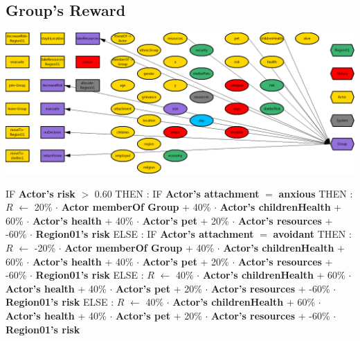 \documentclass{article}%
\begin{document}
%
\subsection{Group's Reward}%
\label{subsec:Group's Reward}%
\includegraphics[width=\textwidth]{images/Group.png}%
\begin{flushleft}%
IF %
\textbf{Actor's risk}%
$>$%
0.60%
\linebreak%
\hspace*{2em}%
THEN %
: %
IF %
\textbf{Actor's attachment}%
$=$%
\textbf{anxious}%
\linebreak%
\hspace*{4em}%
THEN %
: %
$R$%
$\leftarrow$%
20\%%
$\cdot$%
\textbf{Actor memberOf Group}%
+%
40\%%
$\cdot$%
\textbf{Actor's childrenHealth}%
+%
60\%%
$\cdot$%
\textbf{Actor's health}%
+%
40\%%
$\cdot$%
\textbf{Actor's pet}%
+%
20\%%
$\cdot$%
\textbf{Actor's resources}%
+%
{-}60\%%
$\cdot$%
\textbf{Region01's risk}%
\linebreak%
\hspace*{4em}%
ELSE %
: %
IF %
\textbf{Actor's attachment}%
$=$%
\textbf{avoidant}%
\linebreak%
\hspace*{6em}%
THEN %
: %
$R$%
$\leftarrow$%
{-}20\%%
$\cdot$%
\textbf{Actor memberOf Group}%
+%
40\%%
$\cdot$%
\textbf{Actor's childrenHealth}%
+%
60\%%
$\cdot$%
\textbf{Actor's health}%
+%
40\%%
$\cdot$%
\textbf{Actor's pet}%
+%
20\%%
$\cdot$%
\textbf{Actor's resources}%
+%
{-}60\%%
$\cdot$%
\textbf{Region01's risk}%
\linebreak%
\hspace*{6em}%
ELSE %
: %
$R$%
$\leftarrow$%
40\%%
$\cdot$%
\textbf{Actor's childrenHealth}%
+%
60\%%
$\cdot$%
\textbf{Actor's health}%
+%
40\%%
$\cdot$%
\textbf{Actor's pet}%
+%
20\%%
$\cdot$%
\textbf{Actor's resources}%
+%
{-}60\%%
$\cdot$%
\textbf{Region01's risk}%
\linebreak%
\hspace*{2em}%
ELSE %
: %
$R$%
$\leftarrow$%
40\%%
$\cdot$%
\textbf{Actor's childrenHealth}%
+%
60\%%
$\cdot$%
\textbf{Actor's health}%
+%
40\%%
$\cdot$%
\textbf{Actor's pet}%
+%
20\%%
$\cdot$%
\textbf{Actor's resources}%
+%
{-}60\%%
$\cdot$%
\textbf{Region01's risk}%
\end{flushleft}

%
\end{document}
